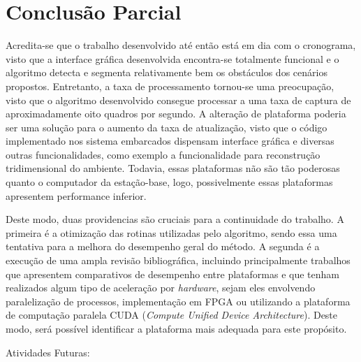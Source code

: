 \chapter{Conclusão Parcial}
\label{Conclusao}


Acredita-se que o trabalho desenvolvido até então está em dia com o cronograma, visto que a interface gráfica desenvolvida encontra-se totalmente funcional e o algoritmo detecta e segmenta relativamente bem os obstáculos dos cenários propostos. Entretanto, a taxa de processamento tornou-se uma preocupação, visto que o algoritmo desenvolvido consegue processar a uma taxa de captura de aproximadamente oito quadros por segundo. A alteração de plataforma poderia ser uma solução para o aumento da taxa de atualização, visto que o código implementado nos sistema embarcados dispensam interface gráfica e diversas outras funcionalidades, como exemplo a funcionalidade para reconstrução tridimensional do ambiente. Todavia, essas plataformas não são tão poderosas quanto o computador da estação-base, logo, possivelmente essas plataformas apresentem performance inferior.

Deste modo, duas providencias  são cruciais para a continuidade do trabalho. A primeira é a otimização das rotinas utilizadas pelo algoritmo, sendo essa uma tentativa para a melhora do desempenho geral do método. A segunda é a execução de uma ampla revisão bibliográfica, incluindo principalmente trabalhos que apresentem comparativos de desempenho entre plataformas e que tenham realizados algum tipo de aceleração por \textit{hardware}, sejam eles envolvendo paralelização de processos, implementação em FPGA ou utilizando a plataforma de computação paralela CUDA (\textit{Compute Unified Device Architecture}). Deste modo, será possível identificar a plataforma mais adequada para este propósito. 

Atividades Futuras:

